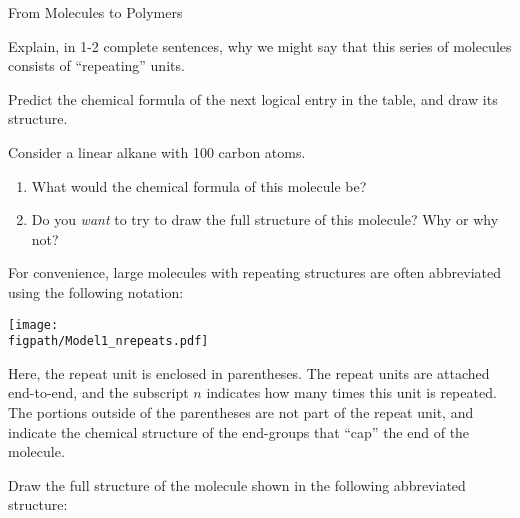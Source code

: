 \begin{activity}{From Molecules to Polymers}
\begin{ctqs}
	\question Explain, in 1-2 complete sentences, why we might say that this series of molecules consists of ``repeating''  units.
			
				\begin{solution}[2in]
				\end{solution}
				
		
	\question Predict the chemical formula of the next logical entry in the table, and draw its structure.
			
				\begin{solution}[1in]
				\end{solution}
		
	\question Consider a linear alkane with 100 carbon atoms. \label{\labelbase:ctq:100Calkane}
		\begin{enumerate}
			
			\item What would the chemical formula of this molecule be?
			
				\begin{solution}[1in]
				\end{solution}
			
			\item Do you \emph{want} to try to draw the full structure of this molecule?  Why or why not?
			
				\begin{solution}[1.5in]
				\end{solution}
		\end{enumerate}
\end{ctqs}

\begin{infobox}
	For convenience, large molecules with repeating structures are often abbreviated using the following notation:
	
	\centerline{\texttt{[image: \\figpath/Model1\_nrepeats.pdf]}}
	
	Here, the repeat unit is enclosed in parentheses.  The repeat units are attached end-to-end, and the subscript $n$ indicates how many times this unit is repeated.  The portions outside of the parentheses are not part of the repeat unit, and indicate the chemical structure of the end-groups that ``cap'' the end of the molecule.
\end{infobox}

\begin{ctqs}
	\question Draw the full structure of the molecule shown in the following abbreviated structure: \label{\labelbase:ctq:abbrevbutane}
	

\end{ctqs}
\end{activity}
